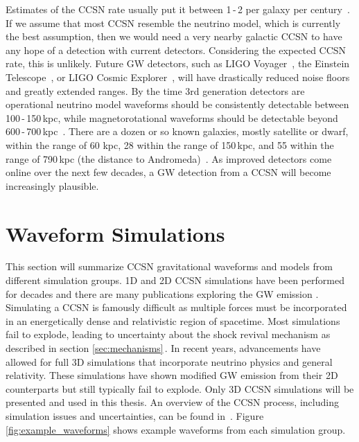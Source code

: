 Estimates of the CCSN rate usually put it between 1\,-\,2 per galaxy per century~\cite{1991ARA&A..29..363V, 1993A&A...273..383C, Alexeyev2002}. If we assume that most CCSN resemble the neutrino model, which is currently the best assumption, then we would need a very nearby galactic CCSN to have any hope of a detection with current detectors. Considering the expected CCSN rate, this is unlikely. Future GW detectors, such as LIGO Voyager~\cite{2015PhRvD..91h2001D, voyagerupgrade}, the Einstein Telescope~\cite{0264-9381-27-19-194002, ET:design}, or LIGO Cosmic Explorer~\cite{2017CQGra..34d4001A, whitepaper2018}, will have drastically reduced noise floors and greatly extended ranges. By the time 3rd generation detectors are operational neutrino model waveforms should be consistently detectable between 100\,-\,150\,kpc, while magnetorotational waveforms should be detectable beyond 600\,-\,700\,kpc~\cite{roma2019astrophysics}. There are a dozen or so known galaxies, mostly satellite or dwarf, within the range of 60 kpc, 28 within the range of 150\,kpc, and 55 within the range of 790\,kpc (the distance to Andromeda)~\cite{karachentsev2004catalog, belokurov2007cats}. As improved detectors come online over the next few decades, a GW detection from a CCSN will become increasingly plausible.

\section{Waveform Simulations}

This section will summarize CCSN gravitational waveforms and models from different simulation groups. 1D and 2D CCSN simulations have been performed for decades and there are many publications exploring the GW emission \cite{muller2004toward, ott2006new, kotake2007gravitational, marek2009equation, yakunin2010gravitational, dimmelmeier2008gravitational}. Simulating a CCSN is famously difficult as multiple forces must be incorporated in an energetically dense and relativistic region of spacetime. Most simulations fail to explode, leading to uncertainty about the shock revival mechanism as described in section \ref{sec:mechanisms}\,. In recent years, advancements have allowed for full 3D simulations that incorporate neutrino physics and general relativity. These simulations have shown modified GW emission from their 2D counterparts but still typically fail to explode. Only 3D CCSN simulations will be presented and used in this thesis. An overview of the CCSN process, including simulation issues and uncertainties, can be found in~\cite{muller2016core}. Figure \ref{fig:example_waveforms} shows example waveforms from each simulation group.

